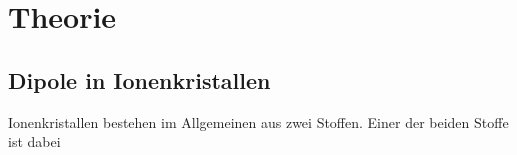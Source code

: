\section{Theorie}
\label{sec:Theorie}

\subsection{Dipole in Ionenkristallen}
Ionenkristallen bestehen im Allgemeinen aus zwei Stoffen.
Einer der beiden Stoffe ist dabei 
